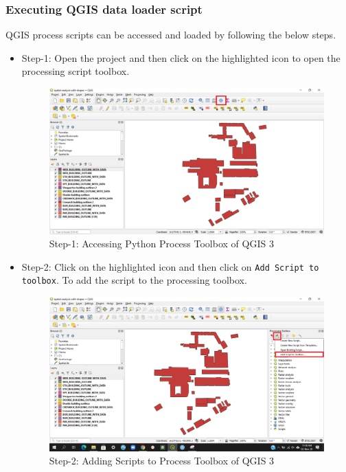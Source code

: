 \subsubsection{Executing QGIS data loader script}

QGIS process scripts can be accessed and loaded by following the below steps.

\begin{itemize}
    \item Step-1: Open the project and then click on the highlighted icon to open the processing script toolbox.
\begin{figure}[H]
\centering
\includegraphics[width=12cm,keepaspectratio=true]{resources/step1.PNG}
\caption{Step-1: Accessing Python Process Toolbox of QGIS 3}
\label{fig:accesstoolbox}
\end{figure}
\item Step-2: Click on the highlighted icon and then click on \texttt{Add Script to toolbox}. To add the script to the processing toolbox.

\begin{figure}[H]
\centering
\includegraphics[width=12cm,keepaspectratio=true]{resources/step2.png}
\caption{Step-2: Adding Scripts to  Process Toolbox of QGIS 3}
\label{fig:addtotoolbox}
\end{figure}


\end{itemize}
